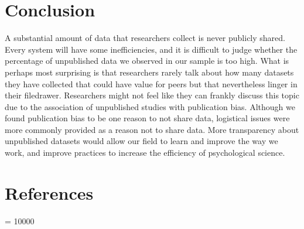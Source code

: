 \documentclass[
  ,jou, a4paper,floatsintext]{apa6}
\begin{document}
\hypertarget{conclusion}{%
\section{Conclusion}\label{conclusion}}

A substantial amount of data that researchers collect is never publicly shared. Every system will have some inefficiencies, and it is difficult to judge whether the percentage of unpublished data we observed in our sample is too high. What is perhaps most surprising is that researchers rarely talk about how many datasets they have collected that could have value for peers but that nevertheless linger in their filedrawer. Researchers might not feel like they can frankly discuss this topic due to the association of unpublished studies with publication bias. Although we found publication bias to be one reason to not share data, logistical issues were more commonly provided as a reason not to share data. More transparency about unpublished datasets would allow our field to learn and improve the way we work, and improve practices to increase the efficiency of psychological science.

\hypertarget{references}{%
\section{References}\label{references}}

\begingroup

\interlinepenalty = 10000
\end{document}
